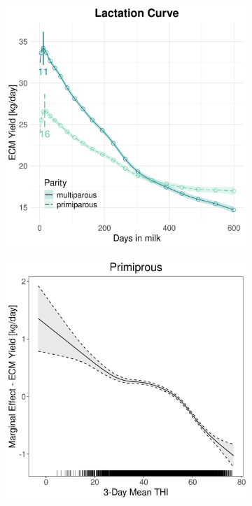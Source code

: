 \begin{figure}[H]
\begin{subfigure}[b]{0.45\textwidth}
        \includegraphics[width=\textwidth]{thesis/figures/models/ecm/after2010/bs_ecm_after2010/bs_ecm_after2010_marginal_dim_milk_combined.png}
    \end{subfigure}
    \begin{subfigure}[b]{0.45\textwidth}
        \centering
        \includegraphics[width=\textwidth]{thesis/figures/models/ecm/after2010/bs_ecm_after2010/bs_ecm_after2010_marginal_thi_milk_primi.png}

\end{subfigure}
\end{figure}
